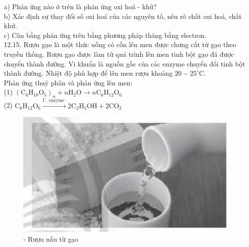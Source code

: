 \documentclass[10pt]{article}
\begin{document}
a) Phản ứng nào ở trên là phản ứng oxi hoá - khử?\\
b) Xác định sự thay đổi số oxi hoá của các nguyên tố, nêu rõ chất oxi hoá, chất khử.\\
c) Cân bằng phản ứng trên bằng phương pháp thăng bằng electron.\\
12.15. Rượu gạo là một thức uống có cồn lên men được chưng cất từ gạo theo truyền thống. Rượu gạo được làm từ quá trình lên men tinh bột gạo đã được chuyển thành đường. Vi khuẩn là nguồn gốc của các enzyme chuyển đổi tinh bột thành đường. Nhiệt độ phù hợp để lên men rượu khoảng $20-25^{\circ} \mathrm{C}$.\\
Phản ứng thuỷ phân và phản ứng lên men:\\
(1) $\left(\mathrm{C}_{6} \mathrm{H}_{10} \mathrm{O}_{5}\right)_{n}+n \mathrm{H}_{2} \mathrm{O} \rightarrow n \mathrm{C}_{6} \mathrm{H}_{12} \mathrm{O}_{6}$\\
(2) $\mathrm{C}_{6} \mathrm{H}_{12} \mathrm{O}_{6} \xrightarrow{\mathrm{I}^{\circ} \text {, enzyme }} 2 \mathrm{C}_{2} \mathrm{H}_{5} \mathrm{OH}+2 \mathrm{CO}_{2}$

\begin{figure}[h]
\begin{center}
  \includegraphics[width=\textwidth]{2025_10_23_883c4b146e2332109fcdg-42}
\captionsetup{labelformat=empty}
\caption{- Rượu nấu từ gạo}
\end{center}
\end{figure}
\end{document}
